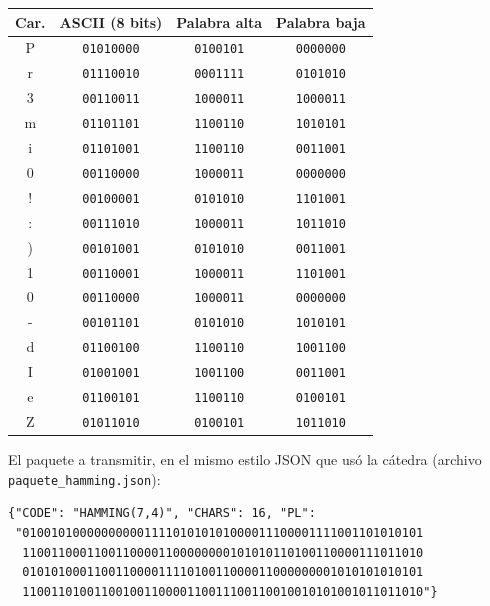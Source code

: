 \documentclass[11pt,a4paper]{article}
\begin{document}
\begin{center}
\begin{tabular}{|c|c|c|c|}
\hline
\textbf{Car.} & \textbf{ASCII (8 bits)} & \textbf{Palabra alta} & \textbf{Palabra baja} \\
\hline
P & \texttt{01010000} & \texttt{0100101} & \texttt{0000000} \\
r & \texttt{01110010} & \texttt{0001111} & \texttt{0101010} \\
3 & \texttt{00110011} & \texttt{1000011} & \texttt{1000011} \\
m & \texttt{01101101} & \texttt{1100110} & \texttt{1010101} \\
i & \texttt{01101001} & \texttt{1100110} & \texttt{0011001} \\
0 & \texttt{00110000} & \texttt{1000011} & \texttt{0000000} \\
! & \texttt{00100001} & \texttt{0101010} & \texttt{1101001} \\
: & \texttt{00111010} & \texttt{1000011} & \texttt{1011010} \\
) & \texttt{00101001} & \texttt{0101010} & \texttt{0011001} \\
1 & \texttt{00110001} & \texttt{1000011} & \texttt{1101001} \\
0 & \texttt{00110000} & \texttt{1000011} & \texttt{0000000} \\
- & \texttt{00101101} & \texttt{0101010} & \texttt{1010101} \\
d & \texttt{01100100} & \texttt{1100110} & \texttt{1001100} \\
I & \texttt{01001001} & \texttt{1001100} & \texttt{0011001} \\
e & \texttt{01100101} & \texttt{1100110} & \texttt{0100101} \\
Z & \texttt{01011010} & \texttt{0100101} & \texttt{1011010} \\
\hline
\end{tabular}
\end{center}

El paquete a transmitir, en el mismo estilo JSON que usó la cátedra (archivo \texttt{paquete\_hamming.json}):

\begin{verbatim}
{"CODE": "HAMMING(7,4)", "CHARS": 16, "PL":
 "01001010000000000111101010101000011100001111001101010101
  11001100011001100001100000000101010110100110000111011010
  01010100011001100001111010011000011000000001010101010101
  11001101001100100110000110011100110010010101001011011010"}
\end{verbatim}
\end{document}
